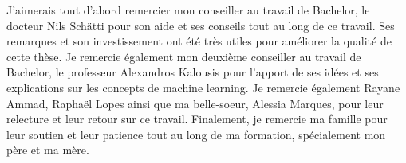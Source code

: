 \documentclass[12pt]{article}
\begin{document}
J'aimerais tout d'abord remercier mon conseiller au travail de Bachelor, le docteur Nils Schätti pour son aide et ses conseils tout au long de ce travail. 
Ses remarques et son investissement ont été très utiles pour améliorer la qualité de cette thèse. 
\newline\newline
Je remercie également mon deuxième conseiller au travail de Bachelor, le professeur Alexandros Kalousis pour l'apport de ses idées et ses explications sur les concepts de machine learning.
\newline\newline
Je remercie également Rayane Ammad, Raphaël Lopes ainsi que ma belle-soeur, Alessia Marques, pour leur relecture et leur retour sur ce travail.
\newline\newline
Finalement, je remercie ma famille pour leur soutien et leur patience tout au long de ma formation, spécialement mon père et ma mère.

\newpage
\end{document}
